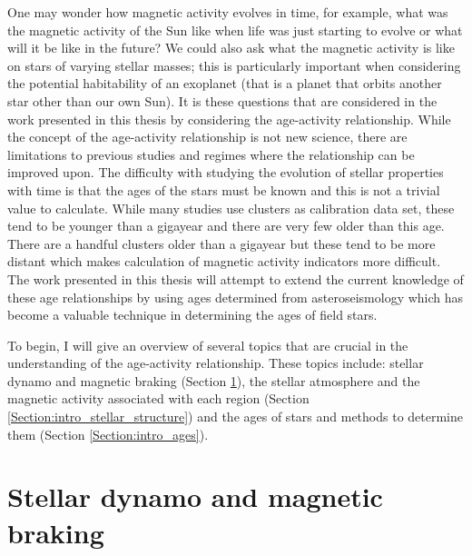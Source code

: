 One may wonder how magnetic activity evolves in time, for example, what was the magnetic activity of the Sun like when life was just starting to evolve or what will it be like in the future? We could also ask what the magnetic activity is like on stars of varying stellar masses; this is particularly important when considering the potential habitability of an exoplanet (that is a planet that orbits another star other than our own Sun). It is these questions that are considered in the work presented in this thesis by considering the age-activity relationship. While the concept of the age-activity relationship is not new science, there are limitations to previous studies and regimes where the relationship can be improved upon. The difficulty with studying the evolution of stellar properties with time is that the ages of the stars must be known and this is not a trivial value to calculate. While many studies use clusters as calibration data set, these tend to be younger than a gigayear and there are very few older than this age. There are a handful clusters older than a gigayear but these tend to be more distant which makes calculation of magnetic activity indicators more difficult. The work presented in this thesis will attempt to extend the current knowledge of these age relationships by using ages determined from asteroseismology which has become a valuable technique in determining the ages of field stars.

To begin, I will give an overview of several topics that are crucial in the understanding of the age-activity relationship. These topics include: stellar dynamo and magnetic braking (Section \ref{Section:intro_dynamo_and_braking_section}), the stellar atmosphere and the magnetic activity associated with each region (Section \ref{Section:intro_stellar_structure}) and the ages of stars and methods to determine them (Section \ref{Section:intro_ages}).

\section{Stellar dynamo and magnetic braking}
\label{Section:intro_dynamo_and_braking_section}

